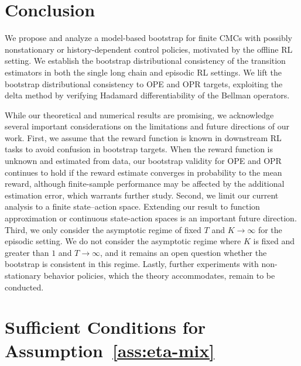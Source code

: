 \documentclass{article}
\numberwithin{equation}{section}
\begin{document}
\section{Conclusion}
\label{sec:conclusion}

We propose and analyze a model-based bootstrap for finite CMCs with possibly nonstationary or history-dependent control policies, motivated by the offline RL setting.
We establish the bootstrap distributional consistency of the transition estimators in both the single long chain and episodic RL settings. 
We lift the bootstrap distributional consistency to OPE and OPR targets, exploiting the delta method by verifying Hadamard differentiability of the Bellman operators.

While our theoretical and numerical results are promising, we acknowledge several important considerations on the limitations and future directions of our work. 
First, we assume that the reward function is known in downstream RL tasks to avoid confusion in bootstrap targets. 
When the reward function is
unknown and estimated from data, our bootstrap validity for OPE and OPR continues to hold if the reward estimate converges in probability
to the mean reward, although finite-sample performance may be affected by
the additional estimation error, which warrants further study.
Second, we limit our current analysis to a finite state--action space. 
Extending our result to function approximation or continuous state-action spaces is an important future direction.
Third, we only consider the asymptotic regime of fixed $T$ and $K\to\infty$ for the episodic setting.
We do not consider the asymptotic regime where $K$ is fixed and greater than $1$ and $T\to\infty$, and it remains an open question whether the bootstrap is consistent in this regime.
Lastly, further experiments with non-stationary behavior policies, which the theory accommodates, remain to be conducted.

\FloatBarrier


\newpage
\FloatBarrier
\appendix

\section{Sufficient Conditions for Assumption~\ref{ass:eta-mix}}
\label{app:mixing}
\end{document}
